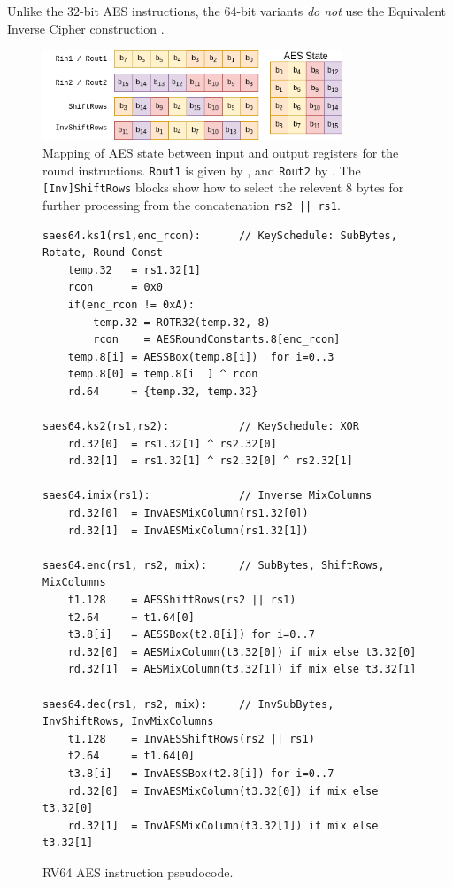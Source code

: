 Unlike the $32$-bit AES instructions, the $64$-bit variants
{\em do not} use the Equivalent Inverse Cipher
construction \cite[Section 5.3.5]{nist:fips:197}.

\begin{figure}[h]
\centering
\includegraphics[width=0.8\textwidth]{diagrams/aes-rv64-state.png}
\caption{
Mapping of AES state between input and output registers for the round
instructions.
{\tt Rout1} is given by ,
and
{\tt Rout2}          by .
The {\tt [Inv]ShiftRows} blocks show how to select the relevent $8$ bytes
for further processing from the concatenation {\tt rs2 || \tt rs1}.
}
\label{fig:aes:rv64:mapping}
\end{figure}

\begin{figure}[h!]
\begin{lstlisting}[language=pseudo]
saes64.ks1(rs1,enc_rcon):      // KeySchedule: SubBytes, Rotate, Round Const
    temp.32   = rs1.32[1]
    rcon      = 0x0
    if(enc_rcon != 0xA):
        temp.32 = ROTR32(temp.32, 8)
        rcon    = AESRoundConstants.8[enc_rcon]
    temp.8[i] = AESSBox(temp.8[i])  for i=0..3
    temp.8[0] = temp.8[i  ] ^ rcon
    rd.64     = {temp.32, temp.32}

saes64.ks2(rs1,rs2):           // KeySchedule: XOR
    rd.32[0]  = rs1.32[1] ^ rs2.32[0]
    rd.32[1]  = rs1.32[1] ^ rs2.32[0] ^ rs2.32[1]

saes64.imix(rs1):              // Inverse MixColumns
    rd.32[0]  = InvAESMixColumn(rs1.32[0])
    rd.32[1]  = InvAESMixColumn(rs1.32[1])

saes64.enc(rs1, rs2, mix):     // SubBytes, ShiftRows, MixColumns
    t1.128    = AESShiftRows(rs2 || rs1)
    t2.64     = t1.64[0]
    t3.8[i]   = AESSBox(t2.8[i]) for i=0..7
    rd.32[0]  = AESMixColumn(t3.32[0]) if mix else t3.32[0]
    rd.32[1]  = AESMixColumn(t3.32[1]) if mix else t3.32[1]

saes64.dec(rs1, rs2, mix):     // InvSubBytes, InvShiftRows, InvMixColumns
    t1.128    = InvAESShiftRows(rs2 || rs1)
    t2.64     = t1.64[0]
    t3.8[i]   = InvAESSBox(t2.8[i]) for i=0..7
    rd.32[0]  = InvAESMixColumn(t3.32[0]) if mix else t3.32[0]
    rd.32[1]  = InvAESMixColumn(t3.32[1]) if mix else t3.32[1]
\end{lstlisting}
\caption{
RV64 AES instruction pseudocode.
}
\label{fig:pesudo:aes:rv64}
\end{figure}

